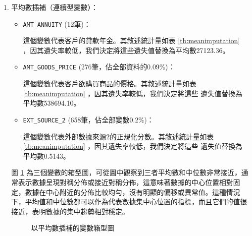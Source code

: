 \documentclass[12pt, a4paper]{article}
\begin{document}
\begin{enumerate}


\item 平均數插補（連續型變數）：

\begin{itemize}

\item \verb|AMT_ANNUITY| (12筆)：

這個變數代表客戶的貸款年金。其敘述統計量如表 \ref{tb:meanimputation} ，因其遺失率較低，我們決定將這些遺失值替換為平均數27123.36。

\item \verb|AMT_GOODS_PRICE| (276筆，佔全部資料的0.09\%)：

這個變數代表客戶欲購買商品的價格。其敘述統計量如表 \ref{tb:meanimputation} ，因其遺失率較低，我們決定將這些
遺失值替換為平均數538694.10。

\item \verb|EXT_SOURCE_2| (658筆，佔全部變數0.2\%)：

這個變數代表外部數據來源2的正規化分數。其敘述統計量如表 \ref{tb:meanimputation} ，因其遺失率較低，我們決定將這些
遺失值替換為平均數0.5143。

\end{itemize}

圖 \ref{fig:meanimputation} 為三個變數的箱型圖，可從圖中觀察到三者平均數和中位數非常接近，通常表示數據呈現對稱分佈或接近對稱分佈，這意味著數據的中心位置相對固定，數據在中心附近的分佈比較均勻，沒有明顯的偏移或異常值。這種情況下，平均值和中位數都可以作為代表數據集中心位置的指標，而且它們的值很接近，表明數據的集中趨勢相對穩定。

\begin{figure}[h]
    \centering
    \caption{以平均數插補的變數箱型圖}
    \label{fig:meanimputation}
\end{figure}


\end{enumerate}
\end{document}
